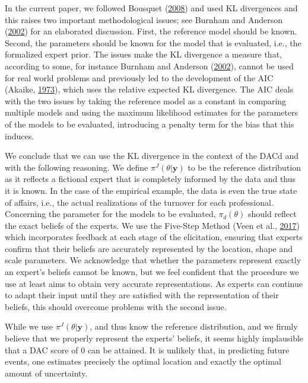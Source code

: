 \documentclass[openright,titlepage,12pt,a4paper]{book}
\begin{document}
In the current paper, we followed Bousquet (\protect\hyperlink{ref-bousquet_diagnostics_2008}{2008}) and used KL divergences and this raises two important methodological issues; see Burnham and Anderson (\protect\hyperlink{ref-burnham_model_2002}{2002}) for an elaborated discussion. First, the reference model should be known. Second, the parameters should be known for the model that is evaluated, i.e., the formalized expert prior. The issues make the KL divergence a measure that, according to some, for instance Burnham and Anderson (\protect\hyperlink{ref-burnham_model_2002}{2002}), cannot be used for real world problems and previously led to the development of the AIC (Akaike, \protect\hyperlink{ref-akaike_information_1973}{1973}), which uses the relative expected KL divergence. The AIC deals with the two issues by taking the reference model as a constant in comparing multiple models and using the maximum likelihood estimates for the parameters of the models to be evaluated, introducing a penalty term for the bias that this induces.

We conclude that we can use the KL divergence in the context of the DACd and with the following reasoning. We define \(\pi^J(\theta|\textbf{y})\) to be the reference distribution as it reflects a fictional expert that is completely informed by the data and thus it is known. In the case of the empirical example, the data is even the true state of affairs, i.e., the actual realizations of the turnover for each professional. Concerning the parameter for the models to be evaluated, \(\pi_d(\theta)\) should reflect the exact beliefs of the experts. We use the Five-Step Method (Veen et al., \protect\hyperlink{ref-veen_proposal_2017}{2017}) which incorporates feedback at each stage of the elicitation, ensuring that experts confirm that their beliefs are accurately represented by the location, shape and scale parameters. We acknowledge that whether the parameters represent exactly an expert's beliefs cannot be known, but we feel confident that the procedure we use at least aims to obtain very accurate representations. As experts can continue to adapt their input until they are satisfied with the representation of their beliefs, this should overcome problems with the second issue.

While we use \(\pi^J(\theta|\textbf{y})\), and thus know the reference distribution, and we firmly believe that we properly represent the experts' beliefs, it seems highly implausible that a DAC score of 0 can be attained. It is unlikely that, in predicting future events, one estimates precisely the optimal location and exactly the optimal amount of uncertainty.
\end{document}

